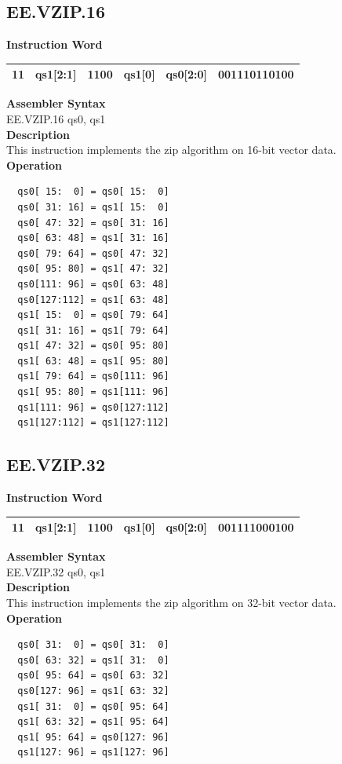 \clearpage
\subsection{EE.VZIP.16}\label{instruction:EEVZIP16}
\setlength\tabcolsep{6pt}
\textbf{Instruction Word} \\
\begin{tabular}{|c|c|c|c|c|c|}
	\hline
	11 & qs1[2:1] & 1100 & qs1[0] & qs0[2:0] & 001110110100 \\
	\hline
\end{tabular}

\textbf{Assembler Syntax} \\
EE.VZIP.16 qs0, qs1 \\
\textbf{Description} \\
This instruction implements the zip algorithm on 16-bit vector data.\\
\textbf{Operation}
\begin{lstlisting}
  qs0[ 15:  0] = qs0[ 15:  0]
  qs0[ 31: 16] = qs1[ 15:  0]
  qs0[ 47: 32] = qs0[ 31: 16]
  qs0[ 63: 48] = qs1[ 31: 16]
  qs0[ 79: 64] = qs0[ 47: 32]
  qs0[ 95: 80] = qs1[ 47: 32]
  qs0[111: 96] = qs0[ 63: 48]
  qs0[127:112] = qs1[ 63: 48]
  qs1[ 15:  0] = qs0[ 79: 64]
  qs1[ 31: 16] = qs1[ 79: 64]
  qs1[ 47: 32] = qs0[ 95: 80]
  qs1[ 63: 48] = qs1[ 95: 80]
  qs1[ 79: 64] = qs0[111: 96]
  qs1[ 95: 80] = qs1[111: 96]
  qs1[111: 96] = qs0[127:112]
  qs1[127:112] = qs1[127:112]
\end{lstlisting}

\clearpage
\subsection{EE.VZIP.32}\label{instruction:EEVZIP32}
\setlength\tabcolsep{6pt}
\textbf{Instruction Word} \\
\begin{tabular}{|c|c|c|c|c|c|}
	\hline
	11 & qs1[2:1] & 1100 & qs1[0] & qs0[2:0] & 001111000100 \\
	\hline
\end{tabular}

\textbf{Assembler Syntax} \\
EE.VZIP.32 qs0, qs1 \\
\textbf{Description} \\
This instruction implements the zip algorithm on 32-bit vector data.\\
\textbf{Operation}
\begin{lstlisting}
  qs0[ 31:  0] = qs0[ 31:  0]
  qs0[ 63: 32] = qs1[ 31:  0]
  qs0[ 95: 64] = qs0[ 63: 32]
  qs0[127: 96] = qs1[ 63: 32]
  qs1[ 31:  0] = qs0[ 95: 64]
  qs1[ 63: 32] = qs1[ 95: 64]
  qs1[ 95: 64] = qs0[127: 96]
  qs1[127: 96] = qs1[127: 96]
\end{lstlisting}

